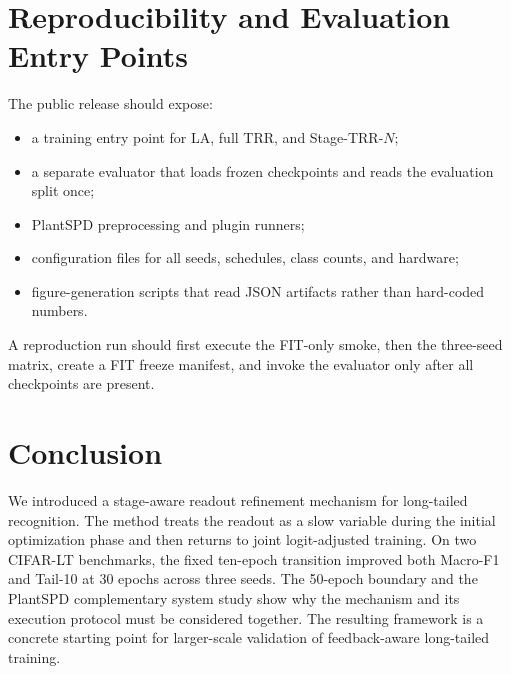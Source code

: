 \documentclass[10pt,letterpaper]{article}
\begin{document}
\section{Reproducibility and Evaluation Entry Points}
The public release should expose:
\begin{itemize}
\item a training entry point for LA, full TRR, and Stage-TRR-$N$;
\item a separate evaluator that loads frozen checkpoints and reads the evaluation split once;
\item PlantSPD preprocessing and plugin runners;
\item configuration files for all seeds, schedules, class counts, and hardware;
\item figure-generation scripts that read JSON artifacts rather than hard-coded numbers.
\end{itemize}
A reproduction run should first execute the FIT-only smoke, then the three-seed matrix, create a FIT freeze manifest, and invoke the evaluator only after all checkpoints are present.

\section{Conclusion}
We introduced a stage-aware readout refinement mechanism for long-tailed recognition. The method treats the readout as a slow variable during the initial optimization phase and then returns to joint logit-adjusted training. On two CIFAR-LT benchmarks, the fixed ten-epoch transition improved both Macro-F1 and Tail-10 at 30 epochs across three seeds. The 50-epoch boundary and the PlantSPD complementary system study show why the mechanism and its execution protocol must be considered together. The resulting framework is a concrete starting point for larger-scale validation of feedback-aware long-tailed training.



\end{document}
